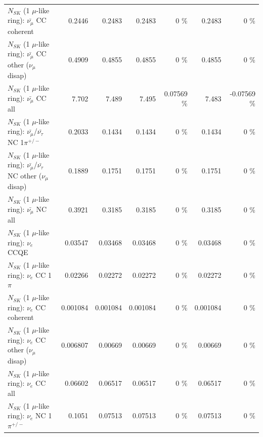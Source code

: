 \begin{table}
\begin{tabular}{| l | r | r | r  r | r  r |}
                       $N_{SK}$ (1 $\mu$-like ring): $\bar{\nu_\mu}$ CC coherent &          0.2446 &          0.2483 &          0.2483 &        0 \%  &          0.2483 &        0 \%  \\ 
        $N_{SK}$ (1 $\mu$-like ring): $\bar{\nu_\mu}$ CC other ($\nu_\mu$ disap) &          0.4909 &          0.4855 &          0.4855 &        0 \%  &          0.4855 &        0 \%  \\ 
                          $N_{SK}$ (1 $\mu$-like ring): $\bar{\nu_{\mu}}$ CC all &           7.702 &           7.489 &           7.495 &  0.07569 \%  &           7.483 & -0.07569 \%  \\ 
\hline
  $N_{SK}$ (1 $\mu$-like ring): $\bar{\nu_\mu}$/$\bar{\nu_\tau}$ NC 1$\pi^{+/-}$ &          0.2033 &          0.1434 &          0.1434 &        0 \%  &          0.1434 &        0 \%  \\ 
$N_{SK}$ (1 $\mu$-like ring): $\bar{\nu_\mu}$/$\bar{\nu_\tau}$ NC other ($\nu_\mu$ disap) &          0.1889 &          0.1751 &          0.1751 &        0 \%  &          0.1751 &        0 \%  \\ 
                          $N_{SK}$ (1 $\mu$-like ring): $\bar{\nu_{\mu}}$ NC all &          0.3921 &          0.3185 &          0.3185 &        0 \%  &          0.3185 &        0 \%  \\ 
\hline
\hline
\hline
                                      $N_{SK}$ (1 $\mu$-like ring): $\nu_e$ CCQE &         0.03547 &         0.03468 &         0.03468 &        0 \%  &         0.03468 &        0 \%  \\ 
                                 $N_{SK}$ (1 $\mu$-like ring): $\nu_e$ CC 1$\pi$ &         0.02266 &         0.02272 &         0.02272 &        0 \%  &         0.02272 &        0 \%  \\ 
                               $N_{SK}$ (1 $\mu$-like ring): $\nu_e$ CC coherent &        0.001084 &        0.001084 &        0.001084 &        0 \%  &        0.001084 &        0 \%  \\ 
                $N_{SK}$ (1 $\mu$-like ring): $\nu_e$ CC other ($\nu_\mu$ disap) &        0.006807 &         0.00669 &         0.00669 &        0 \%  &         0.00669 &        0 \%  \\ 
                                  $N_{SK}$ (1 $\mu$-like ring): $\nu_{e}$ CC all &         0.06602 &         0.06517 &         0.06517 &        0 \%  &         0.06517 &        0 \%  \\ 
\hline
                           $N_{SK}$ (1 $\mu$-like ring): $\nu_e$ NC 1$\pi^{+/-}$ &          0.1051 &         0.07513 &         0.07513 &        0 \%  &         0.07513 &        0 \%  \\ 

\end{tabular}
\end{table}
